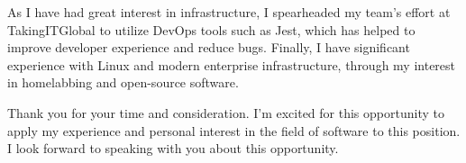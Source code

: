 \documentclass[11pt, a4paper]{awesome-cv}
\begin{document}
\begin{cvletter}
As I have had great interest in infrastructure, 
I spearheaded my team's effort at TakingITGlobal to utilize DevOps tools such as Jest,
which has helped to improve developer experience and reduce bugs.
Finally, I have significant experience with Linux and modern enterprise infrastructure,
through my interest in homelabbing and open-source software.

Thank you for your time and consideration.
I'm excited for this opportunity to apply my experience and 
personal interest in the field of software to this position.
I look forward to speaking with you about this opportunity.

\end{cvletter}


\makeletterclosing
\end{document}
